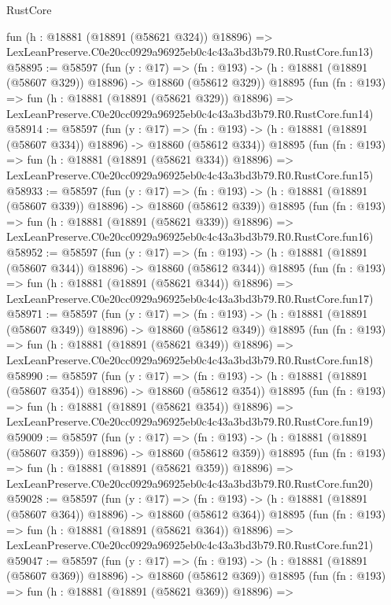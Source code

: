 \begin{lexlean}{RustCore}
\begin{coremodule}
    fun (h : @18881 (@18891 (@58621 @324)) @18896) =>
    LexLeanPreserve.C0e20cc0929a96925eb0c4c43a3bd3b79.R0.RustCore.fun13)
@58895 := @58597
    (fun (y : @17) =>
    (fn : @193) -> (h : @18881 (@18891 (@58607 @329)) @18896) -> @18860 (@58612 @329))
    @18895
    (fun (fn : @193) =>
    fun (h : @18881 (@18891 (@58621 @329)) @18896) =>
    LexLeanPreserve.C0e20cc0929a96925eb0c4c43a3bd3b79.R0.RustCore.fun14)
@58914 := @58597
    (fun (y : @17) =>
    (fn : @193) -> (h : @18881 (@18891 (@58607 @334)) @18896) -> @18860 (@58612 @334))
    @18895
    (fun (fn : @193) =>
    fun (h : @18881 (@18891 (@58621 @334)) @18896) =>
    LexLeanPreserve.C0e20cc0929a96925eb0c4c43a3bd3b79.R0.RustCore.fun15)
@58933 := @58597
    (fun (y : @17) =>
    (fn : @193) -> (h : @18881 (@18891 (@58607 @339)) @18896) -> @18860 (@58612 @339))
    @18895
    (fun (fn : @193) =>
    fun (h : @18881 (@18891 (@58621 @339)) @18896) =>
    LexLeanPreserve.C0e20cc0929a96925eb0c4c43a3bd3b79.R0.RustCore.fun16)
@58952 := @58597
    (fun (y : @17) =>
    (fn : @193) -> (h : @18881 (@18891 (@58607 @344)) @18896) -> @18860 (@58612 @344))
    @18895
    (fun (fn : @193) =>
    fun (h : @18881 (@18891 (@58621 @344)) @18896) =>
    LexLeanPreserve.C0e20cc0929a96925eb0c4c43a3bd3b79.R0.RustCore.fun17)
@58971 := @58597
    (fun (y : @17) =>
    (fn : @193) -> (h : @18881 (@18891 (@58607 @349)) @18896) -> @18860 (@58612 @349))
    @18895
    (fun (fn : @193) =>
    fun (h : @18881 (@18891 (@58621 @349)) @18896) =>
    LexLeanPreserve.C0e20cc0929a96925eb0c4c43a3bd3b79.R0.RustCore.fun18)
@58990 := @58597
    (fun (y : @17) =>
    (fn : @193) -> (h : @18881 (@18891 (@58607 @354)) @18896) -> @18860 (@58612 @354))
    @18895
    (fun (fn : @193) =>
    fun (h : @18881 (@18891 (@58621 @354)) @18896) =>
    LexLeanPreserve.C0e20cc0929a96925eb0c4c43a3bd3b79.R0.RustCore.fun19)
@59009 := @58597
    (fun (y : @17) =>
    (fn : @193) -> (h : @18881 (@18891 (@58607 @359)) @18896) -> @18860 (@58612 @359))
    @18895
    (fun (fn : @193) =>
    fun (h : @18881 (@18891 (@58621 @359)) @18896) =>
    LexLeanPreserve.C0e20cc0929a96925eb0c4c43a3bd3b79.R0.RustCore.fun20)
@59028 := @58597
    (fun (y : @17) =>
    (fn : @193) -> (h : @18881 (@18891 (@58607 @364)) @18896) -> @18860 (@58612 @364))
    @18895
    (fun (fn : @193) =>
    fun (h : @18881 (@18891 (@58621 @364)) @18896) =>
    LexLeanPreserve.C0e20cc0929a96925eb0c4c43a3bd3b79.R0.RustCore.fun21)
@59047 := @58597
    (fun (y : @17) =>
    (fn : @193) -> (h : @18881 (@18891 (@58607 @369)) @18896) -> @18860 (@58612 @369))
    @18895
    (fun (fn : @193) =>
    fun (h : @18881 (@18891 (@58621 @369)) @18896) =>

\end{coremodule}
\end{lexlean}
